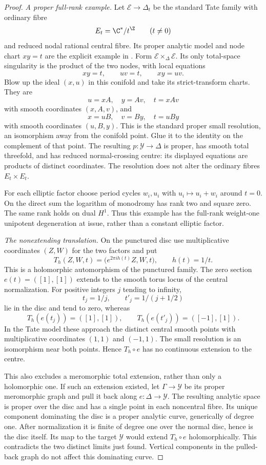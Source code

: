\begin{proof}
\emph{A proper full-rank example.}
Let $\mathcal E\to\Delta_t$ be the standard Tate
family with ordinary fibre
\[
 E_t=\C^*/t^{\Z}\qquad(t\ne0)
\]
and reduced nodal rational central fibre. Its
proper analytic model and node chart $xy=t$
are the explicit example in
\citet[Sections 1.1.1--1.1.3, pp.~73--74]{KKN2008Root}.
Form $\mathcal E\times_{\Delta}\mathcal E$.
Its only total-space singularity is the product
of the two nodes, with local equations
\[
 xy=t,\qquad uv=t,\qquad xy=uv.
\]
Blow up the ideal $(x,u)$ in this conifold and
take its strict-transform charts. They are
\[
 u=xA,\quad y=Av,\quad t=xAv
\]
with smooth coordinates $(x,A,v)$, and
\[
 x=uB,\quad v=By,\quad t=uBy
\]
with smooth coordinates $(u,B,y)$. This is the
standard proper small resolution, an isomorphism
away from the conifold point. Glue it to the
identity on the complement of that point. The
resulting $p:\mathcal Y\to\Delta$ is proper,
has smooth total threefold, and has reduced
normal-crossing centre: its displayed equations
are products of distinct coordinates. The
resolution does not alter the ordinary fibres
$E_t\times E_t$.

For each elliptic factor choose period cycles
$w_i,u_i$ with $u_i\mapsto u_i+w_i$ around
$t=0$. On the direct sum the logarithm of
monodromy has rank two and square zero.
The same rank holds on dual $H^1$. Thus this
example has the full-rank weight-one
unipotent degeneration at issue, rather than
a constant elliptic factor.

\emph{The nonextending translation.}
On the punctured disc use multiplicative
coordinates $(Z,W)$ for the two factors and put
\[
 T_h(Z,W,t)=\bigl(e^{2\pi i h(t)}Z,W,t\bigr),
 \qquad h(t)=1/t.
 \tag{B.4.29.1}
\]
This is a holomorphic automorphism of the
punctured family. The zero section
$e(t)=([1],[1])$ extends to the smooth torus
locus of the central normalization. For
positive integers $j$ tending to infinity,
\[
 t_j=1/j,\qquad t'_j=1/(j+1/2)
\]
lie in the disc and tend to zero, whereas
\[
 T_h(e(t_j))=([1],[1]),\qquad
 T_h(e(t'_j))=([-1],[1]).
\]
In the Tate model these approach the distinct
central smooth points with multiplicative
coordinates $(1,1)$ and $(-1,1)$.
The small resolution is an isomorphism near
both points. Hence $T_h\circ e$ has no
continuous extension to the centre.

This also excludes a meromorphic total
extension, rather than only a holomorphic
one. If such an extension existed, let
$\Gamma\to\mathcal Y$ be its proper
meromorphic graph and pull it back along
$e:\Delta\to\mathcal Y$. The resulting
analytic space is proper over the disc and
has a single point in each noncentral fibre.
Its unique component dominating the disc
is a proper analytic curve, generically of
degree one. After normalization it is finite
of degree one over the normal disc, hence
is the disc itself. Its map to the target
$\mathcal Y$ would extend $T_h\circ e$
holomorphically. This contradicts the two
distinct limits just found. Vertical
components in the pulled-back graph do
not affect this dominating curve.


\end{proof}
